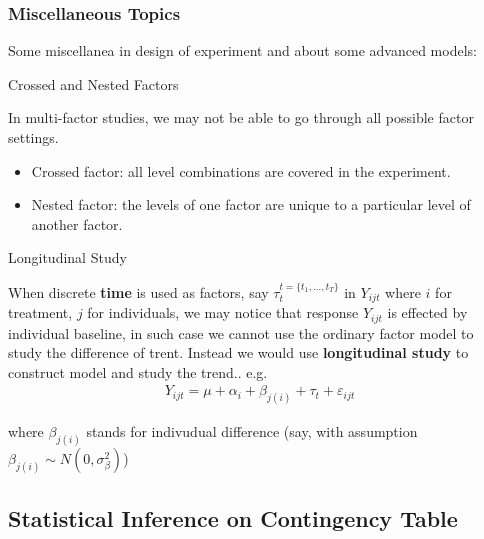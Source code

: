     

\subsubsection{Miscellaneous Topics}
Some miscellanea in design of experiment and about some advanced models:

\begin{point}
    Crossed and Nested Factors
\end{point}

In multi-factor studies, we may not be able to go through all possible factor settings.

\begin{itemize}[topsep=2pt,itemsep=0pt]
    \item Crossed factor: all level combinations are covered in the experiment.
    \item Nested factor: the levels of one factor are unique to a particular level of another factor.

    
\end{itemize}

    

\begin{point}
    Longitudinal Study
\end{point}

    When discrete \textbf{time} is used as factors, say $ \tau_t^{t=\{t_1,\ldots,t_T\}} $ in $ Y_{ijt} $ where $ i $ for treatment, $ j $ for individuals, we may notice that response $ Y_{ijt} $ is effected by individual baseline, in such case we cannot use the ordinary factor model to study the difference of trent. Instead we would use \textbf{longitudinal study} to construct model and study the trend.. e.g.
    \begin{align}
        Y_{ijt}=\mu +\alpha _i+\beta _{j(i)}+\tau_t+\varepsilon _{ijt} 
    \end{align}
    
    where $ \beta _{j(i)} $ stands for indivudual difference (say, with assumption $ \beta _{j(i)}\sim N(0,\sigma ^2_\beta ) $)


    



\subsection{Statistical Inference on Contingency Table}

